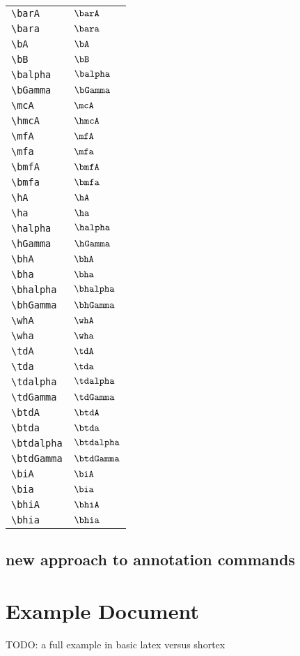 \documentclass{article}
\begin{document}
\begin{tabular}{ll}
    \verb!\barA! & $\barA$ \\
    \verb!\bara! & $\bara$ \\
    \verb!\bA! & $\bA$ \\
    \verb!\bB! & $\bB$ \\
    \verb!\balpha! & $\balpha$ \\
    \verb!\bGamma! & $\bGamma$ \\
    \verb!\mcA! & $\mcA$ \\
    \verb!\hmcA! & $\hmcA$ \\
    \verb!\mfA! & $\mfA$ \\
    \verb!\mfa! & $\mfa$ \\
    \verb!\bmfA! & $\bmfA$ \\
    \verb!\bmfa! & $\bmfa$ \\
    \verb!\hA! & $\hA$ \\
    \verb!\ha! & $\ha$ \\
    \verb!\halpha! & $\halpha$ \\
    \verb!\hGamma! & $\hGamma$ \\
    \verb!\bhA! & $\bhA$ \\
    \verb!\bha! & $\bha$ \\
    \verb!\bhalpha! & $\bhalpha$ \\
    \verb!\bhGamma! & $\bhGamma$ \\
    \verb!\whA! & $\whA$ \\
    \verb!\wha! & $\wha$ \\
    \verb!\tdA! & $\tdA$ \\
    \verb!\tda! & $\tda$ \\
    \verb!\tdalpha! & $\tdalpha$ \\
    \verb!\tdGamma! & $\tdGamma$ \\
    \verb!\btdA! & $\btdA$ \\
    \verb!\btda! & $\btda$ \\
    \verb!\btdalpha! & $\btdalpha$ \\
    \verb!\btdGamma! & $\btdGamma$ \\
    \verb!\biA! & $\biA$ \\
    \verb!\bia! & $\bia$ \\
    \verb!\bhiA! & $\bhiA$ \\
    \verb!\bhia! & $\bhia$ \\
\end{tabular}


\subsection{new approach to annotation commands}
\section{Example Document}

TODO: a full example in basic latex versus shortex
\end{document}
